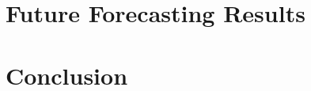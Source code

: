 \documentclass[12pt]{report}
\begin{document}
\chapter{Future Forecasting Results}   %
\label{Chapter5:Future-Results}




\chapter{Conclusion}                            %
\label{Chapter6:Conclusion}







\end{document}
